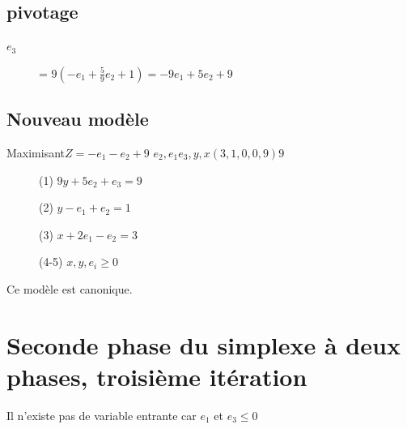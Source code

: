 \subsection{pivotage}
\begin{description}
\item[$e_3$] = $9(-e_1 + \frac{5}{9}e_2 + 1) = -9e_1 + 5e_2 + 9$
\end{description}

\subsection{Nouveau modèle}
        {Maximisant}{$Z = -e_1 -e_2 + 9$}
        {$e_2,e_1$}{$e_3,y,x$}{$(3,1,0,0,9)$}{$9$}
        {\begin{description}
\item[] (1) $9y + 5e_2 + e_3 = 9$
\item[] (2) $y - e_1 + e_2 = 1$
\item[] (3) $x + 2e_1 - e_2 = 3$
\item[] (4-5) $x,y,e_i \geqslant 0$
\end{description}
}
Ce modèle est canonique.

\section{Seconde phase du simplexe à deux phases, troisième itération}
Il n'existe pas de variable entrante car $e_1$ et $e_3 \leqslant 0$
\pagebreak